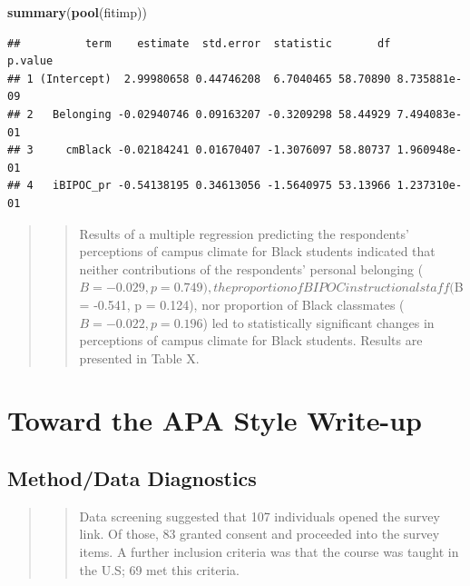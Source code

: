 \documentclass[
  11pt,
]{book}
\newenvironment{Shaded}{\begin{snugshade}}{\end{snugshade}}
\newcommand{\FunctionTok}[1]{\textcolor[rgb]{0.27,0.27,0.27}{\textbf{#1}}}
\newcommand{\NormalTok}[1]{#1}
\begin{document}
\begin{Shaded}
\begin{Highlighting}[]
\FunctionTok{summary}\NormalTok{(}\FunctionTok{pool}\NormalTok{(fitimp))}
\end{Highlighting}
\end{Shaded}

\begin{verbatim}
##          term    estimate  std.error  statistic       df      p.value
## 1 (Intercept)  2.99980658 0.44746208  6.7040465 58.70890 8.735881e-09
## 2   Belonging -0.02940746 0.09163207 -0.3209298 58.44929 7.494083e-01
## 3     cmBlack -0.02184241 0.01670407 -1.3076097 58.80737 1.960948e-01
## 4   iBIPOC_pr -0.54138195 0.34613056 -1.5640975 53.13966 1.237310e-01
\end{verbatim}

\begin{quote}
\begin{quote}
Results of a multiple regression predicting the respondents' perceptions of campus climate for Black students indicated that neither contributions of the respondents' personal belonging (\(B = -0.029, p = 0.749),the proportion of BIPOC instructional staff (\)B = -0.541, p = 0.124), nor proportion of Black classmates (\(B = -0.022, p = 0.196\)) led to statistically significant changes in perceptions of campus climate for Black students. Results are presented in Table X.
\end{quote}
\end{quote}

\hypertarget{toward-the-apa-style-write-up-1}{%
\section{Toward the APA Style Write-up}\label{toward-the-apa-style-write-up-1}}

\hypertarget{methoddata-diagnostics}{%
\subsection{Method/Data Diagnostics}\label{methoddata-diagnostics}}

\begin{quote}
\begin{quote}
Data screening suggested that 107 individuals opened the survey link. Of those, 83 granted consent and proceeded into the survey items. A further inclusion criteria was that the course was taught in the U.S; 69 met this criteria.
\end{quote}
\end{quote}
\end{document}
